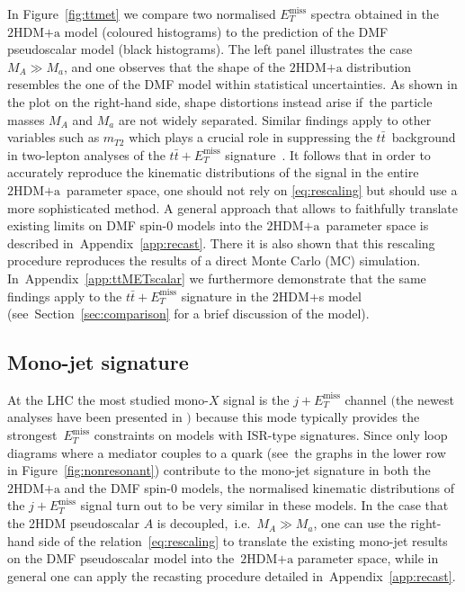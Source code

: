 \documentclass[a4paper, 11pt,notoc]{article}
\newcommand{\MET}{\ensuremath{E_T^\mathrm{miss}}\xspace}
\newcommand{\mA}{\ensuremath{M_{A}}\xspace}
\newcommand{\ma}{\ensuremath{M_{a}}\xspace}
\newcommand{\hdma}{\ensuremath{\textrm{2HDM+a}}\xspace}
\begin{document}
In Figure~\ref{fig:ttmet} we compare two normalised $\MET$ spectra obtained in the \hdma model (coloured histograms) to the prediction of the DMF pseudoscalar   model (black histograms).  The left panel illustrates the case~$M_A \gg M_a$, and one observes that the shape of the \hdma distribution resembles  the one of the DMF model within statistical uncertainties. As shown in the plot on the right-hand side, shape distortions instead arise if~the particle masses $M_A$ and $M_a$ are not widely separated.  Similar findings apply to other variables such as $m_{T2}$ which  plays a crucial role in suppressing the $t \bar t$~background in two-lepton analyses of the $t \bar t + \MET$ signature~\cite{Aaboud:2017rzf,Haisch:2016gry,CMS-PAS-EXO-17-014}. It follows that in order to accurately reproduce the kinematic distributions of the signal in the entire \hdma~parameter space, one should not rely on \eqref{eq:rescaling} but should use a more sophisticated method. A general approach  that allows to faithfully translate existing limits on DMF spin-0   models into the \hdma~parameter space  is described in~Appendix~\ref{app:recast}. There it is also shown that this rescaling procedure reproduces the results of a direct Monte Carlo (MC) simulation.  In~Appendix~\ref{app:ttMETscalar} we furthermore demonstrate that the same findings apply to the $t \bar t + \MET$ signature in the 2HDM+s model  (see~Section~\ref{sec:comparison} for a brief discussion of the model).

\subsection*{Mono-jet signature}

At the LHC the most studied mono-$X$ signal is the $j +\MET$ channel $\big($the newest analyses have been presented in \cite{Aaboud:2017phn,Sirunyan:2017jix}$\big)$ because this mode typically provides the strongest~$\MET$ constraints on models with ISR-type  signatures. Since only loop diagrams where a mediator couples to a quark (see~the graphs in the lower row in Figure~\ref{fig:nonresonant}) contribute to the mono-jet signature in both the \hdma and the DMF spin-0 models, the normalised kinematic distributions of the $j +\MET$ signal turn out to be very similar in these models.  In the case that the 2HDM pseudoscalar $A$ is decoupled,~i.e.~$\mA \gg \ma$, one can use the right-hand side of the relation~\eqref{eq:rescaling} to translate the existing mono-jet results on the DMF pseudoscalar model into the~\hdma parameter space, while in general one can apply the recasting procedure detailed in~Appendix~\ref{app:recast}.
\end{document}
